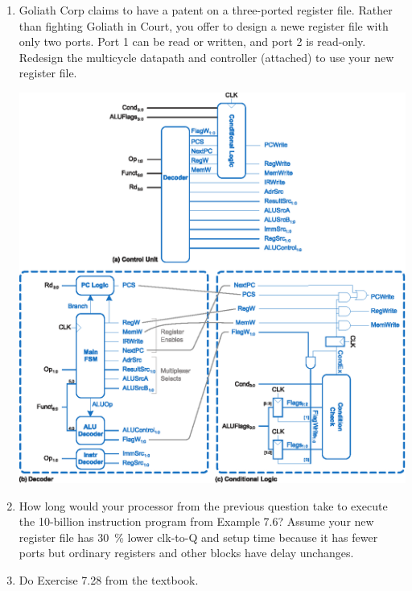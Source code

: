 \documentclass{e85}
\begin{document}
\begin{enumerate}
\item Goliath Corp claims to have a patent on a three-ported register
  file.  Rather than fighting Goliath in Court, you offer to design a
  newe register file with only two ports.  Port 1 can be read or
  written, and port 2 is read-only.  Redesign the multicycle datapath
  and controller (attached) {\figurebelow} to use your new register
  file.
  \begin{center}
    \includegraphics[width=\linewidth]
    {figures/ddca-multicycle-control-unit.eps}
  \end{center}

  \begin{solution}
  \end{solution}

\item How long would your processor from the previous question take to
  execute the 10-billion instruction program from Example 7.6?  Assume
  your new register file has \SI{30}{\percent} lower clk-to-Q and
  setup time because it has fewer ports but ordinary registers and
  other blocks have delay unchanges.

  \begin{solution}
  \end{solution}

\item Do Exercise 7.28 from the textbook.


\end{enumerate}
\end{document}
